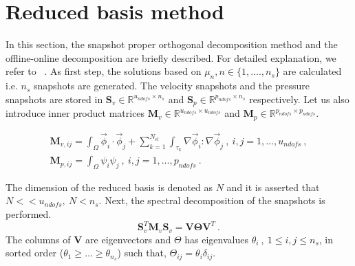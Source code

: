 \documentclass[graybox]{svmult}
\begin{document}
\section{Reduced basis method}\label{rb_section}

In this section, the snapshot proper orthogonal decomposition method and the offline-online decomposition are briefly described. For detailed explanation, we refer to ~\cite{CRBM}.
As first step, the solutions based on $\mu_n, n \in \lbrace 1,....,n_s \rbrace$ are calculated i.e. $n_s$ snapshots are generated. The velocity snapshots and the pressure snapshots are stored in $\bm{S}_v \in \mathbb{R}^{u_{ndofs} \times n_s}$ and $\bm{S}_p \in \mathbb{R}^{p_{ndofs} \times n_s}$ respectively. Let us also introduce inner product matrices $\bm{M}_v \in \mathbb{R}^{u_{ndofs} \times u_{ndofs}}$ and $\bm{M}_p \in \mathbb{R}^{p_{ndofs} \times p_{ndofs}}$.

\begin{gather*}
\bm{M}_{v,ij} = \int_{\Omega} \overrightarrow{\phi}_i \cdot \overrightarrow{\phi}_j + \sum_{k=1}^{N_{el}} \int_{\tau_k} \nabla \overrightarrow{\phi}_i : \nabla \overrightarrow{\phi}_j \ , \ i,j = 1, \ldots, u_{ndofs} \ , \\
\bm{M}_{p,ij} = \int_{\Omega} \psi_i \psi_j \ , \ i,j = 1, \ldots, p_{ndofs} \ .
\end{gather*}

The dimension of the reduced basis is denoted as $N$ and it is asserted that $N << u_{ndofs}, \ N < n_s$. Next, the spectral decomposition of the snapshots is performed.
\begin{equation}\label{snapshot_eigen_value}
\bm{S}_v^T \bm{M}_v \bm{S}_v = \bm{V} \bm{\Theta} \bm{V}^T \ .
\end{equation}
The columns of $\bm{V}$ are eigenvectors and $\Theta$ has eigenvalues $\theta_i \ , \ 1 \leq i,j \leq n_s$, in sorted order ($\theta_1 \geq \ldots \geq \theta_{n_s}$) such that, $\Theta_{ij} = \theta_i \delta_{ij}$.

\end{document}
